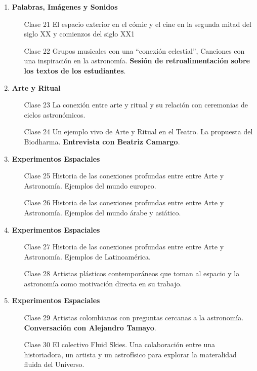 \documentclass[12pt]{report}
\begin{document}
\begin{enumerate}
\item {\bf Palabras, Im\'agenes y Sonidos}
\begin{itemize}
\item[Clase 21] El espacio exterior en el c\'omic y el cine en la
  segunda mitad del siglo XX y comienzos del siglo XX1 
\item[Clase 22] Grupos musicales con una ``conexi\'on celestial'',
  Canciones con una inspiraci\'on en la astronom\'ia.  
  {\bf Sesi\'on de retroalimentaci\'on sobre los textos de los estudiantes}.
\end{itemize}

\item {\bf Arte y Ritual}
\begin{itemize}
\item[Clase 23] La conexi\'on entre arte y ritual y su relaci\'on con
  ceremonias de ciclos astron\'omicos.
\item[Clase 24] Un ejemplo vivo de Arte y Ritual en el Teatro. La
  propuesta del Biodharma. {\bf Entrevista con Beatriz Camargo}. 
\end{itemize}

\item {\bf Experimentos Espaciales}
\begin{itemize}
\item[Clase 25] Historia de las conexiones profundas entre entre Arte
  y Astronom\'ia. Ejemplos del mundo europeo. 
\item[Clase 26]  Historia de las conexiones profundas entre entre Arte
  y Astronom\'ia. Ejemplos del mundo \'arabe y asi\'atico.
\end{itemize}

\item {\bf Experimentos Espaciales}
\begin{itemize}
\item[Clase 27] Historia de las conexiones profundas entre entre Arte
  y Astronom\'ia. Ejemplos de Latinoam\'erica. 
\item[Clase 28] Artistas pl\'asticos contempor\'aneos que toman al
  espacio y la astronom\'ia como motivaci\'on directa en su trabajo. 
\end{itemize}

\item {\bf Experimentos Espaciales}
\begin{itemize}
\item[Clase 29] Artistas colombianos con preguntas cercanas a la
  astronom\'ia. {\bf Conversaci\'on con Alejandro Tamayo}.
\item[Clase 30] El colectivo Fluid Skies. Una colaboraci\'on entre una
  historiadora, un artista y un astrof\'isico para explorar la
  materalidad fluida del Universo.
\end{itemize}

\end{enumerate}
\end{document}
